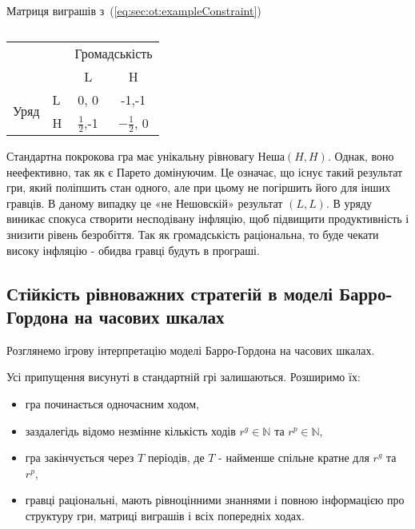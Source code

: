 \begin{table}[h]
	\centering
	
	\caption{}	
 Матриця виграшів з~(\ref{eq:sec:ot:exampleConstraint})\\
	\normalsize
\begin{tabular}{|l|l|c|c|}
	\hline
	\multicolumn{2}{|l|}{\multirow{2}{*}{}} & \multicolumn{2}{l|}{Громадськість} \\ \cline{3-4} 
	\multicolumn{2}{|l|}{}                  & L                & H                \\ \hline
	\multirow{2}{*}{Уряд}    & L   & 0, 0             & -1,-1            \\ \cline{2-4} 
	& H   & $\frac{1}{2}$,-1             & $-\frac{1}{2}$, 0            \\ \hline
\end{tabular}
		
	\label{table:sec:ot:real}
\end{table}


Стандартна покрокова гра має унікальну рівновагу Неша$(H,H)$. Однак, воно неефективно, так як є Парето домінуючим. Це означає, що існує такий результат гри, який поліпшить стан одного, але при цьому не погіршить його для інших гравців. В даному випадку це «не Нешовскій» результат $(L,L)$.  В уряду виникає спокуса створити несподівану інфляцію, щоб підвищити продуктивність і знизити рівень безробіття. Так як громадськість раціональна, то буде чекати високу інфляцію - обидва гравці будуть в програші.

\subsection{Стійкість рівноважних стратегій в моделі Барро-Гордона на
	часових шкалах} 

Розглянемо ігрову інтерпретацію моделі Барро-Гордона на часових шкалах.

Усі припущення висунуті в стандартній грі залишаються. Розширимо їх:
\begin{itemize}
	\item гра починається одночасним ходом, 
	\item заздалегідь відомо незмінне кількість ходів $r^g \in \mathbb{N}$ та $r^p \in \mathbb{N}$,
	\item гра закінчується через $T$ періодів, де $T$ - найменше спільне кратне для $r^g$ та $r^p$,
	\item гравці раціональні, мають рівноцінними знаннями і повною інформацією про структуру гри, матриці виграшів і всіх попередніх ходах.
\end{itemize}

